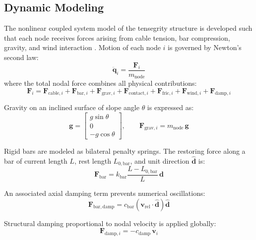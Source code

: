\documentclass[conference]{IEEEtran}
\begin{document}
\subsection{Dynamic Modeling}

The nonlinear coupled system model of the tensegrity structure is developed
such that each node receives forces arising from cable tension, bar
compression, gravity, and wind interaction \cite{b3,b4}. Motion of each node
$i$ is governed by Newton's second law:
%
\begin{equation}
\label{eq:dynamics}
\ddot{\mathbf{q}}_i = \frac{\mathbf{F}_i}{m_{\mathrm{node}}}
\end{equation}
%
where the total nodal force combines all physical contributions:
%
\begin{equation}
\label{eq:total_force}
\mathbf{F}_i = \mathbf{F}_{\mathrm{cable},i} + \mathbf{F}_{\mathrm{bar},i}
             + \mathbf{F}_{\mathrm{grav},i} + \mathbf{F}_{\mathrm{contact},i}
             + \mathbf{F}_{\mathrm{fric},i} + \mathbf{F}_{\mathrm{wind},i}
             + \mathbf{F}_{\mathrm{damp},i}
\end{equation}

Gravity on an inclined surface of slope angle $\theta$ is expressed as:
%
\begin{equation}
\label{eq:gravity}
\mathbf{g} = \begin{bmatrix}
g\sin\theta \\ 0 \\ -g\cos\theta
\end{bmatrix}, \qquad
\mathbf{F}_{\mathrm{grav},i} = m_{\mathrm{node}}\,\mathbf{g}
\end{equation}

Rigid bars are modeled as bilateral penalty springs. The restoring force along
a bar of current length $L$, rest length $L_{0,\mathrm{bar}}$, and unit direction
$\hat{\mathbf{d}}$ is:
%
\begin{equation}
\label{eq:bar_force}
\mathbf{F}_{\mathrm{bar}} = k_{\mathrm{bar}}
\frac{L - L_{0,\mathrm{bar}}}{L}\,\mathbf{d}
\end{equation}

An associated axial damping term prevents numerical oscillations:
%
\begin{equation}
\label{eq:bar_damp}
\mathbf{F}_{\mathrm{bar,damp}} = c_{\mathrm{bar}}
\left( \mathbf{v}_{\mathrm{rel}} \cdot \hat{\mathbf{d}} \right) \hat{\mathbf{d}}
\end{equation}

Structural damping proportional to nodal velocity is applied globally:
%
\begin{equation}
\label{eq:struct_damp}
\mathbf{F}_{\mathrm{damp},i} = -c_{\mathrm{damp}}\,\mathbf{v}_i
\end{equation}
\end{document}
